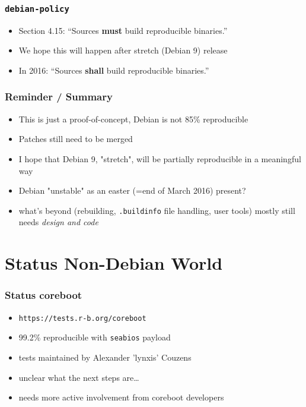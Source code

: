 \documentclass[14pt]{beamer}
\newif\ifplacelogo
\begin{document}
\begin{frame}
 \frametitle{\texttt{debian-policy}}

 \begin{itemize}
  \item Section 4.15: “Sources \textbf{must} build reproducible binaries.”
  \item<2-3> We hope this will happen after stretch (Debian 9) release
  \item<3> In 2016: “Sources \textbf{shall} build reproducible binaries.”
 \end{itemize}
\end{frame}

\begin{frame}
 \frametitle{Reminder / Summary}
 \begin{itemize}
  \item This is just a proof-of-concept, Debian is not 85\% reproducible
  \item Patches still need to be merged
  \item<2-4> I hope that Debian 9, "stretch", will be partially reproducible in a meaningful way
  \item<3-4> Debian "unstable" as an easter (=end of March 2016) present?
  \item<4> what's beyond (rebuilding, \texttt{.buildinfo} file handling, user
  tools) mostly still needs \it{design} and code

 \end{itemize}
\end{frame}

\section{Status Non-Debian World}

\placelogofalse

\begin{frame}
 \frametitle{Status coreboot}
 \begin{itemize}
  \item \texttt{https://tests.r-b.org/coreboot}
  \item 99.2\% reproducible with \texttt{seabios} payload
  \item tests maintained by Alexander 'lynxis' Couzens
  \item unclear what the next steps are…
  \item needs more active involvement from coreboot developers
 \end{itemize}
\end{frame}
\end{document}
